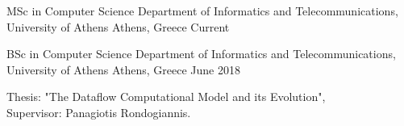 

\begin{cventries}


	\cventry
	{MSc in Computer Science} %
	{Department of Informatics and Telecommunications, University of Athens} %
	{Athens, Greece} %
	{Current} %
	{
	}

  \cventry
    {BSc in Computer Science} %
    {Department of Informatics and Telecommunications, University of Athens} %
    {Athens, Greece} %
    {June 2018} %
    {
      \begin{cvitems} %
        \item {Thesis: "The Dataflow Computational Model and its Evolution", \\ Supervisor: Panagiotis Rondogiannis.}
      \end{cvitems}
    }


\end{cventries}
